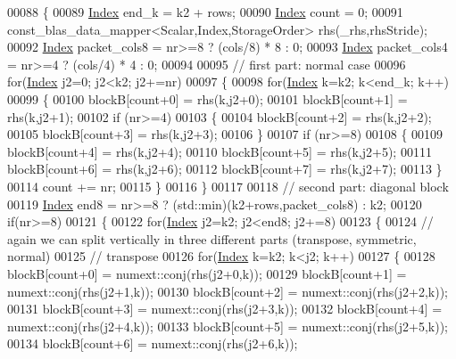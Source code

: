 \begin{DoxyCode}
00088   \{
00089     \hyperlink{namespace_eigen_a62e77e0933482dafde8fe197d9a2cfde}{Index} end\_k = k2 + rows;
00090     \hyperlink{namespace_eigen_a62e77e0933482dafde8fe197d9a2cfde}{Index} count = 0;
00091     const\_blas\_data\_mapper<Scalar,Index,StorageOrder> rhs(\_rhs,rhsStride);
00092     \hyperlink{namespace_eigen_a62e77e0933482dafde8fe197d9a2cfde}{Index} packet\_cols8 = nr>=8 ? (cols/8) * 8 : 0;
00093     \hyperlink{namespace_eigen_a62e77e0933482dafde8fe197d9a2cfde}{Index} packet\_cols4 = nr>=4 ? (cols/4) * 4 : 0;
00094 
00095     \textcolor{comment}{// first part: normal case}
00096     \textcolor{keywordflow}{for}(\hyperlink{namespace_eigen_a62e77e0933482dafde8fe197d9a2cfde}{Index} j2=0; j2<k2; j2+=nr)
00097     \{
00098       \textcolor{keywordflow}{for}(\hyperlink{namespace_eigen_a62e77e0933482dafde8fe197d9a2cfde}{Index} k=k2; k<end\_k; k++)
00099       \{
00100         blockB[count+0] = rhs(k,j2+0);
00101         blockB[count+1] = rhs(k,j2+1);
00102         \textcolor{keywordflow}{if} (nr>=4)
00103         \{
00104           blockB[count+2] = rhs(k,j2+2);
00105           blockB[count+3] = rhs(k,j2+3);
00106         \}
00107         \textcolor{keywordflow}{if} (nr>=8)
00108         \{
00109           blockB[count+4] = rhs(k,j2+4);
00110           blockB[count+5] = rhs(k,j2+5);
00111           blockB[count+6] = rhs(k,j2+6);
00112           blockB[count+7] = rhs(k,j2+7);
00113         \}
00114         count += nr;
00115       \}
00116     \}
00117 
00118     \textcolor{comment}{// second part: diagonal block}
00119     \hyperlink{namespace_eigen_a62e77e0933482dafde8fe197d9a2cfde}{Index} end8 = nr>=8 ? (std::min)(k2+rows,packet\_cols8) : k2;
00120     \textcolor{keywordflow}{if}(nr>=8)
00121     \{
00122       \textcolor{keywordflow}{for}(\hyperlink{namespace_eigen_a62e77e0933482dafde8fe197d9a2cfde}{Index} j2=k2; j2<end8; j2+=8)
00123       \{
00124         \textcolor{comment}{// again we can split vertically in three different parts (transpose, symmetric, normal)}
00125         \textcolor{comment}{// transpose}
00126         \textcolor{keywordflow}{for}(\hyperlink{namespace_eigen_a62e77e0933482dafde8fe197d9a2cfde}{Index} k=k2; k<j2; k++)
00127         \{
00128           blockB[count+0] = numext::conj(rhs(j2+0,k));
00129           blockB[count+1] = numext::conj(rhs(j2+1,k));
00130           blockB[count+2] = numext::conj(rhs(j2+2,k));
00131           blockB[count+3] = numext::conj(rhs(j2+3,k));
00132           blockB[count+4] = numext::conj(rhs(j2+4,k));
00133           blockB[count+5] = numext::conj(rhs(j2+5,k));
00134           blockB[count+6] = numext::conj(rhs(j2+6,k));

\end{DoxyCode}
